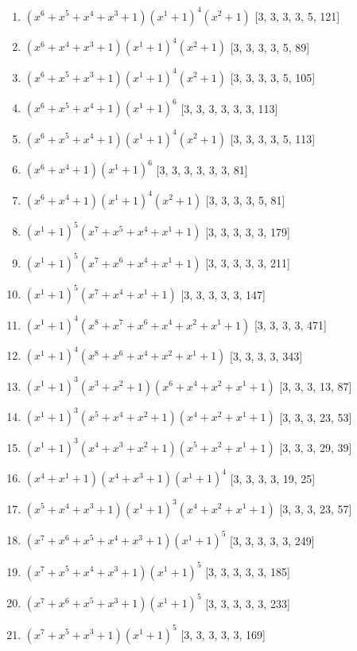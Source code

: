 \documentclass[10pt,twocolumn]{article}
\begin{document}
\begin{enumerate}
\item $(x^{6} + x^{5} + x^{4} + x^{3} + 1)(x^{1} + 1)^{4}(x^{2} + 1)$  [3, 3, 3, 3, 5, 121]
\item $(x^{6} + x^{4} + x^{3} + 1)(x^{1} + 1)^{4}(x^{2} + 1)$  [3, 3, 3, 3, 5, 89]
\item $(x^{6} + x^{5} + x^{3} + 1)(x^{1} + 1)^{4}(x^{2} + 1)$  [3, 3, 3, 3, 5, 105]
\item $(x^{6} + x^{5} + x^{4} + 1)(x^{1} + 1)^{6}$  [3, 3, 3, 3, 3, 3, 113]
\item $(x^{6} + x^{5} + x^{4} + 1)(x^{1} + 1)^{4}(x^{2} + 1)$  [3, 3, 3, 3, 5, 113]
\item $(x^{6} + x^{4} + 1)(x^{1} + 1)^{6}$  [3, 3, 3, 3, 3, 3, 81]
\item $(x^{6} + x^{4} + 1)(x^{1} + 1)^{4}(x^{2} + 1)$  [3, 3, 3, 3, 5, 81]
\item $(x^{1} + 1)^{5}(x^{7} + x^{5} + x^{4} + x^{1} + 1)$  [3, 3, 3, 3, 3, 179]
\item $(x^{1} + 1)^{5}(x^{7} + x^{6} + x^{4} + x^{1} + 1)$  [3, 3, 3, 3, 3, 211]
\item $(x^{1} + 1)^{5}(x^{7} + x^{4} + x^{1} + 1)$  [3, 3, 3, 3, 3, 147]
\item $(x^{1} + 1)^{4}(x^{8} + x^{7} + x^{6} + x^{4} + x^{2} + x^{1} + 1)$  [3, 3, 3, 3, 471]
\item $(x^{1} + 1)^{4}(x^{8} + x^{6} + x^{4} + x^{2} + x^{1} + 1)$  [3, 3, 3, 3, 343]
\item $(x^{1} + 1)^{3}(x^{3} + x^{2} + 1)(x^{6} + x^{4} + x^{2} + x^{1} + 1)$  [3, 3, 3, 13, 87]
\item $(x^{1} + 1)^{3}(x^{5} + x^{4} + x^{2} + 1)(x^{4} + x^{2} + x^{1} + 1)$  [3, 3, 3, 23, 53]
\item $(x^{1} + 1)^{3}(x^{4} + x^{3} + x^{2} + 1)(x^{5} + x^{2} + x^{1} + 1)$  [3, 3, 3, 29, 39]
\item $(x^{4} + x^{1} + 1)(x^{4} + x^{3} + 1)(x^{1} + 1)^{4}$  [3, 3, 3, 3, 19, 25]
\item $(x^{5} + x^{4} + x^{3} + 1)(x^{1} + 1)^{3}(x^{4} + x^{2} + x^{1} + 1)$  [3, 3, 3, 23, 57]
\item $(x^{7} + x^{6} + x^{5} + x^{4} + x^{3} + 1)(x^{1} + 1)^{5}$  [3, 3, 3, 3, 3, 249]
\item $(x^{7} + x^{5} + x^{4} + x^{3} + 1)(x^{1} + 1)^{5}$  [3, 3, 3, 3, 3, 185]
\item $(x^{7} + x^{6} + x^{5} + x^{3} + 1)(x^{1} + 1)^{5}$  [3, 3, 3, 3, 3, 233]
\item $(x^{7} + x^{5} + x^{3} + 1)(x^{1} + 1)^{5}$  [3, 3, 3, 3, 3, 169]

\end{enumerate}
\end{document}
